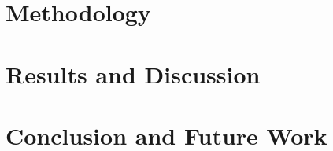 \documentclass[12pt,a4paper]{report}
\begin{document}
\chapter{Methodology}
\newpage










\chapter{Results and Discussion}
\newpage


\chapter{Conclusion and Future Work}
\newpage





\newpage
{}

\end{document}

